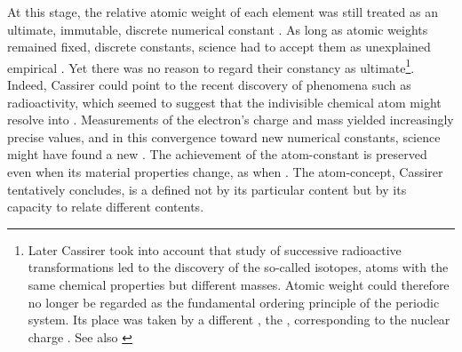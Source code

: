 \documentclass[submitted,12pt]{article}
\begin{document}
At this stage, the relative atomic weight of each element was still treated as an ultimate, immutable, discrete numerical constant . As long as atomic weights remained fixed, discrete constants, science had to accept them as unexplained empirical  . Yet there was no reason to regard their constancy as ultimate\footnote{Later Cassirer took into account that study of successive radioactive transformations led to the discovery of the so-called isotopes, atoms with the same chemical properties but different masses. Atomic weight could therefore no longer be regarded as the fundamental ordering principle of the periodic system. Its place was taken by a different , the , corresponding to the nuclear charge . See also \cite{Cassirer1936a}}. Indeed, Cassirer could point to the recent discovery of phenomena such as radioactivity, which seemed to suggest that the indivisible chemical atom might resolve into  . Measurements of the electron's charge and mass yielded increasingly precise values, and in this convergence toward new numerical constants, science might have found a new  . The achievement  of the atom-constant is preserved even when its material properties change, as when  . The atom-concept, Cassirer tentatively concludes, is a    defined not by its particular content but by its capacity to relate different contents.



\end{document}
